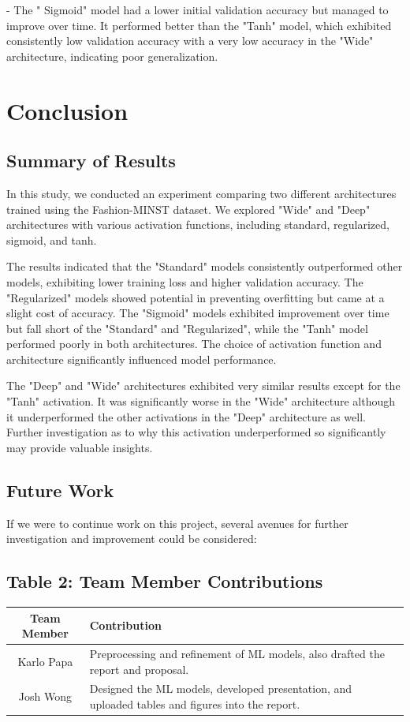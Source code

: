 \documentclass{article}
\begin{document}
- The " Sigmoid" model had a lower initial validation accuracy but managed to improve over time. It performed better than the "Tanh" model, which exhibited consistently low validation accuracy with a very low accuracy in the "Wide" architecture, indicating poor generalization.


\section{Conclusion}
\subsection{Summary of Results}

In this study, we conducted an experiment comparing two different architectures trained using the Fashion-MINST dataset. We explored "Wide" and "Deep" architectures with various activation functions, including standard, regularized, sigmoid, and tanh. 

The results indicated that the "Standard" models consistently outperformed other models, exhibiting lower training loss and higher validation accuracy. The "Regularized" models showed potential in preventing overfitting but came at a slight cost of accuracy. The "Sigmoid" models exhibited improvement over time but fall short of the "Standard" and "Regularized", while the "Tanh" model performed poorly in both architectures. The choice of activation function and architecture significantly influenced model performance.

The "Deep" and "Wide" architectures exhibited very similar results except for the "Tanh" activation. It was significantly worse in the "Wide" architecture although it underperformed the other activations in the "Deep" architecture as well. Further investigation as to why this activation underperformed so significantly may provide valuable insights. 

\subsection{Future Work}
If we were to continue work on this project, several avenues for further investigation and improvement could be considered:



\subsection{Table 2: Team Member Contributions}
\begin{table}[h]
\centering
\begin{tabular}{|c|p{10cm}|}
\hline
\textbf{Team Member} & \textbf{Contribution} \\
\hline
Karlo Papa & Preprocessing and refinement of ML models, also drafted the report and proposal. \\
\hline
Josh Wong & Designed the ML models, developed presentation, and uploaded tables and figures into the report. \\
\hline
\end{tabular}
\end{table}
\end{document}
